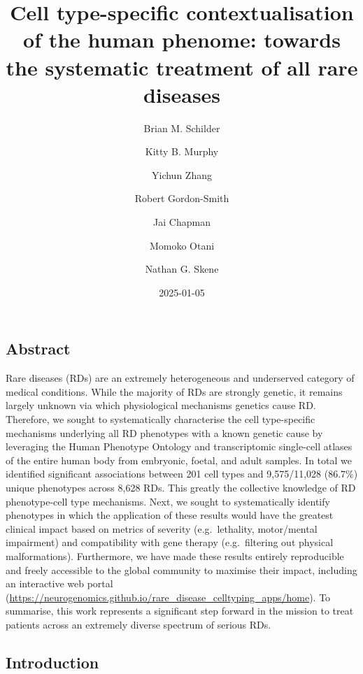 \documentclass[
]{article}
\title{Cell type-specific contextualisation of the human phenome:
towards the systematic treatment of all rare diseases}
\author{Brian M. Schilder \and Kitty B. Murphy \and Yichun
Zhang \and Robert Gordon-Smith \and Jai Chapman \and Momoko
Otani \and Nathan G. Skene}
\date{2025-01-05}
\begin{document}
\maketitle


\newpage{}

\subsection{Abstract}\label{abstract}

Rare diseases (RDs) are an extremely heterogeneous and underserved
category of medical conditions. While the majority of RDs are strongly
genetic, it remains largely unknown via which physiological mechanisms
genetics cause RD. Therefore, we sought to systematically characterise
the cell type-specific mechanisms underlying all RD phenotypes with a
known genetic cause by leveraging the Human Phenotype Ontology and
transcriptomic single-cell atlases of the entire human body from
embryonic, foetal, and adult samples. In total we identified significant
associations between 201 cell types and 9,575/11,028 (86.7\%) unique
phenotypes across 8,628 RDs. This greatly the collective knowledge of RD
phenotype-cell type mechanisms. Next, we sought to systematically
identify phenotypes in which the application of these results would have
the greatest clinical impact based on metrics of severity
(e.g.~lethality, motor/mental impairment) and compatibility with gene
therapy (e.g.~filtering out physical malformations). Furthermore, we
have made these results entirely reproducible and freely accessible to
the global community to maximise their impact, including an interactive
web portal
(\url{https://neurogenomics.github.io/rare_disease_celltyping_apps/home}).
To summarise, this work represents a significant step forward in the
mission to treat patients across an extremely diverse spectrum of
serious RDs.

\subsection{Introduction}\label{sec-introduction}
\end{document}
